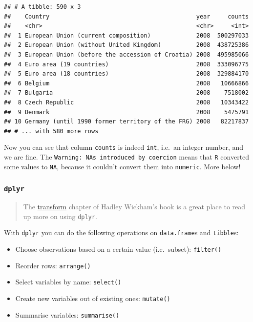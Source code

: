 \documentclass[]{book}
\providecommand{\tightlist}{%
  \setlength{\itemsep}{0pt}\setlength{\parskip}{0pt}}
\begin{document}
\begin{verbatim}
## # A tibble: 590 x 3
##    Country                                          year     counts
##    <chr>                                            <chr>     <int>
##  1 European Union (current composition)             2008  500297033
##  2 European Union (without United Kingdom)          2008  438725386
##  3 European Union (before the accession of Croatia) 2008  495985066
##  4 Euro area (19 countries)                         2008  333096775
##  5 Euro area (18 countries)                         2008  329884170
##  6 Belgium                                          2008   10666866
##  7 Bulgaria                                         2008    7518002
##  8 Czech Republic                                   2008   10343422
##  9 Denmark                                          2008    5475791
## 10 Germany (until 1990 former territory of the FRG) 2008   82217837
## # ... with 580 more rows
\end{verbatim}

Now you can see that column \texttt{counts} is indeed \texttt{int},
i.e.~an integer number, and we are fine. The
\texttt{Warning:\ NAs\ introduced\ by\ coercion} means that \texttt{R}
converted some values to \texttt{NA}, because it couldn't convert them
into \texttt{numeric}. More below!

\subsubsection{\texorpdfstring{\texttt{dplyr}}{dplyr}}\label{dplyr}

\begin{quote}
The \href{http://r4ds.had.co.nz/transform.html}{transform} chapter of
Hadley Wickham's book is a great place to read up more on using
\texttt{dplyr}.
\end{quote}

With \texttt{dplyr} you can do the following operations on
\texttt{data.frame}s and \texttt{tibble}s:

\begin{itemize}
\tightlist
\item
  Choose observations based on a certain value (i.e.~subset):
  \texttt{filter()}
\item
  Reorder rows: \texttt{arrange()}
\item
  Select variables by name: \texttt{select()}
\item
  Create new variables out of existing ones: \texttt{mutate()}
\item
  Summarise variables: \texttt{summarise()}
\end{itemize}
\end{document}
